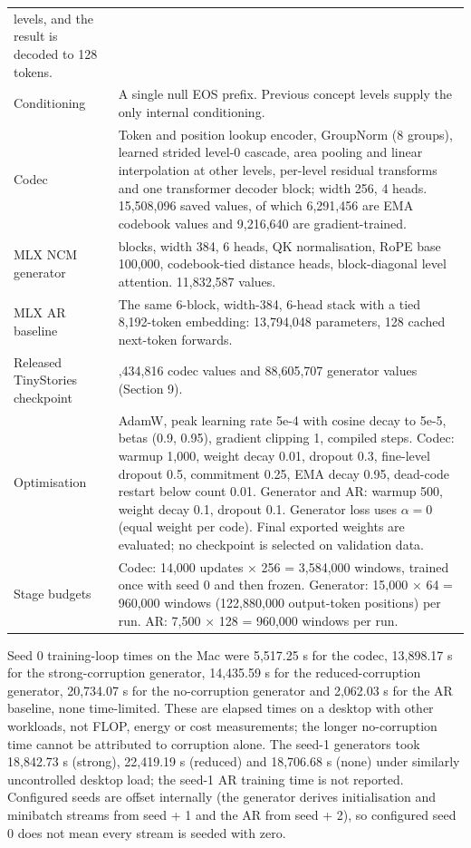 \documentclass[
  british,
]{article}
\newcounter{none} %
\begin{document}
\begin{longtable}[]{@{}
  >{\raggedright\arraybackslash}p{}
  >{\raggedright\arraybackslash}p{}@{}}
levels, and the result is decoded to 128 tokens. \\
Conditioning & A single null EOS prefix. Previous concept levels supply
the only internal conditioning. \\
Codec & Token and position lookup encoder, GroupNorm (8 groups), learned
strided level-0 cascade, area pooling and linear interpolation at other
levels, per-level residual transforms and one transformer decoder block;
width 256, 4 heads. 15,508,096 saved values, of which 6,291,456 are EMA
codebook values and 9,216,640 are gradient-trained. \\
MLX NCM generator & 6 blocks, width 384, 6 heads, QK normalisation, RoPE
base 100,000, codebook-tied distance heads, block-diagonal level
attention. 11,832,587 values. \\
MLX AR baseline & The same 6-block, width-384, 6-head stack with a tied
8,192-token embedding: 13,794,048 parameters, 128 cached next-token
forwards. \\
Released TinyStories checkpoint & 36,434,816 codec values and 88,605,707
generator values (Section 9). \\
Optimisation & AdamW, peak learning rate 5e-4 with cosine decay to 5e-5,
betas (0.9, 0.95), gradient clipping 1, compiled steps. Codec: warmup
1,000, weight decay 0.01, dropout 0.3, fine-level dropout 0.5,
commitment 0.25, EMA decay 0.95, dead-code restart below count 0.01.
Generator and AR: warmup 500, weight decay 0.1, dropout 0.1. Generator
loss uses \(\alpha = 0\) (equal weight per code). Final exported weights
are evaluated; no checkpoint is selected on validation data. \\
Stage budgets & Codec: 14,000 updates × 256 = 3,584,000 windows, trained
once with seed 0 and then frozen. Generator: 15,000 × 64 = 960,000
windows (122,880,000 output-token positions) per run. AR: 7,500 × 128 =
960,000 windows per run. \\
\end{longtable}

Seed 0 training-loop times on the Mac were 5,517.25 s for the codec,
13,898.17 s for the strong-corruption generator, 14,435.59 s for the
reduced-corruption generator, 20,734.07 s for the no-corruption
generator and 2,062.03 s for the AR baseline, none time-limited. These
are elapsed times on a desktop with other workloads, not FLOP, energy or
cost measurements; the longer no-corruption time cannot be attributed to
corruption alone. The seed-1 generators took 18,842.73 s (strong),
22,419.19 s (reduced) and 18,706.68 s (none) under similarly
uncontrolled desktop load; the seed-1 AR training time is not reported.
Configured seeds are offset internally (the generator derives
initialisation and minibatch streams from seed + 1 and the AR from seed
+ 2), so configured seed 0 does not mean every stream is seeded with
zero.
\end{document}

